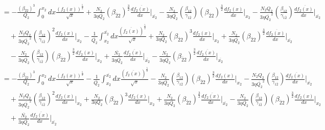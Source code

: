 \documentclass[fleqn, 10pt]{article}
\begin{document}
    \begin{equation*}
    \begin{split}
     & = - \frac{(\beta_{\overline{2}2})^{3}}{Q_{2}} \int^{x_{2}}_{0} dx \frac{(f_{2}(x))^\frac{5}{2}}{\sqrt{x}} + \frac{N_{2}}{3 \eta \overline{Q_{2}}} (\beta_{\overline{2}2})^\frac{3}{2}   \frac{d\overline{f_{2}(x)}}{dx} \Bigg|_{\overline{x_{2}}} - \frac{N_{2}}{3 \eta \overline{Q_{2}}} \left( \frac{\beta_{12}}{\gamma_{1\overline{2}}}\right) (\beta_{\overline{2}2})^\frac{3}{2}   \frac{df_{2}(x)}{dx} \Bigg|_{x_{2}}  - \frac{N_{2} Q_{2}}{3 \eta \overline{Q_{2}}^{2}} \left( \frac{\beta_{12}}{\gamma_{1\overline{2}}}\right)   \frac{d\overline{f_{2}(x)}}{dx} \Bigg|_{\overline{x_{2}}} \\ & \quad + \frac{N_{2} Q_{2}}{3 \eta \overline{Q_{2}}^{2}} \left( \frac{\beta_{12}}{\gamma_{1\overline{2}}}\right)^{2}   \frac{df_{2}(x)}{dx} \Bigg|_{x_{2}} - \frac{1}{\overline{Q_{2}}} \int^{\overline{x_{2}}}_{x_{2}} dx \frac{(\overline{f_{2}(x)})^\frac{5}{2}}{\sqrt{x}} + \frac{N_{2}}{3\eta Q_{2}} (\beta_{\overline{2}2})^{3}   \frac{df_{2}(x)}{dx} \Bigg|_{x_{2}} + \frac{N_{2}}{3 \eta \overline{Q_{2}}} (\beta_{\overline{2}2})^\frac{3}{2}   \frac{d\overline{f_{2}(x)}}{dx}\Bigg|_{\overline{x_{2}}} \\ & \quad - \frac{N_{2}}{3 \eta \overline{Q_{2}}} \left( \frac{\beta_{12}}{\gamma_{1\overline{2}}}\right) (\beta_{\overline{2}2})^\frac{3}{2}   \frac{df_{2}(x)}{dx} \Bigg|_{x_{2}} + \frac{\overline{N_{2}}}{3 \eta \overline{Q_{2}}}   \frac{d\overline{f_{2}(x)}}{dx} \Bigg|_{\overline{x_{2}}} - \frac{N_{2}}{3 \eta \overline{Q_{2}}} (\beta_{\overline{2}2})^\frac{3}{2}  \frac{d\overline{f_{2}(x)}}{dx}\Bigg|_{\overline{x_{2}}}
        \end{split}
    \end{equation*}
\begin{equation*}
\begin{split}
   &= - \frac{(\beta_{\overline{2}2})^{3}}{Q_{2}} \int^{x_{2}}_{0} dx \frac{(f_{2}(x))^\frac{5}{2}}{\sqrt{x}}  - \frac{1}{\overline{Q_{2}}} \int^{\overline{x_{2}}}_{x_{2}} dx \frac{(\overline{f_{2}(x)})^\frac{5}{2}}{\sqrt{x}} - \frac{N_{2}}{3 \eta \overline{Q_{2}}} \left( \frac{\beta_{12}}{\gamma_{1\overline{2}}}\right) (\beta_{\overline{2}2})^\frac{3}{2}   \frac{df_{2}(x)}{dx} \Bigg|_{x_{2}} - \frac{N_{2} Q_{2}}{3 \eta \overline{Q_{2}}^{2}} \left( \frac{\beta_{12}}{\gamma_{1\overline{2}}}\right)  \frac{d\overline{f_{2}(x)}}{dx} \Bigg|_{\overline{x_{2}}} \\ & \quad + \frac{N_{2} Q_{2}}{3 \eta \overline{Q_{2}}^{2}} \left( \frac{\beta_{12}}{\gamma_{1\overline{2}}}\right)^{2}   \frac{df_{2}(x)}{dx} \Bigg|_{x_{2}} + \frac{N_{2}}{3 \eta Q_{2} } (\beta_{\overline{2}2})^{3}   \frac{df_{2}(x)}{dx} \Bigg|_{x_{2}} + \frac{N_{2}}{ 3\eta \overline{Q_{2}}} (\beta_{\overline{2}2})^{\frac{3}{2}}   \frac{d\overline{f_{2}(x)}}{dx} \Bigg|_{\overline{x_{2}}} - \frac{N_{2}}{3\eta \overline{Q_{2}}} \left( \frac{\beta_{12}}{\gamma_{1\overline{2}}}\right) (\beta_{\overline{2}2})^\frac{3}{2}   \frac{df_{2}(x)}{dx} \Bigg|_{x_{2}} \\ & \quad  + \frac{\overline{N_{2}}}{3\eta \overline{Q_{2}}}   \frac{d\overline{f_{2}(x)}}{dx}\Bigg|_{\overline{x_{2}}}
    \end{split}
\end{equation*}
\end{document}
